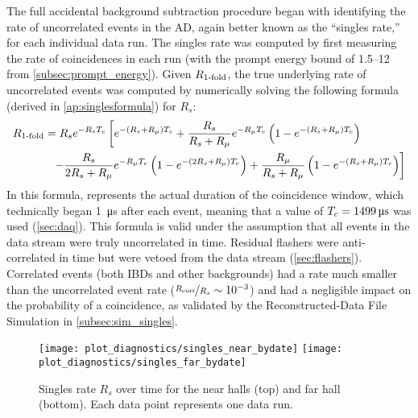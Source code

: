 The full accidental background subtraction procedure began with identifying
the rate of uncorrelated events in the AD, again better known
as the ``singles rate,'' for each individual data run.
The singles rate was computed by first measuring the rate of
 coincidences in each run
(with the prompt energy bound of \SIrange{1.5}{12}{\mev} from \cref{subsec:prompt_energy}).
Given $R_\text{\ensuremath{1}-fold}$, the true underlying rate of uncorrelated events was
computed by numerically solving the following formula
(derived in \cref{ap:singlesformula}) for $R_s$:
\begin{align}
    \label{eq:rsingles}
    \begin{split}
        R_{\text{\fold{1}}}
          &= R_s e^{-R_s\tc}
          \left[
              e^{-(R_s + R_\mu)\tc} +
              \frac{R_s}{R_s+R_\mu} e^{-R_\mu\tc}
              \left(
                  1 - e^{-(R_s + R_\mu)\tc}
              \right)
          \right. \\
          &\ \ %
          \left. - \frac{R_s}{2R_s + R_\mu} e^{-R_\mu\tc}
              \left(
                  1 - e^{-(2R_s + R_\mu)\tc}
              \right) +
              \frac{R_\mu}{R_s + R_\mu}
              \left(
                  1 - e^{-(R_s + R_\mu)\tc}
              \right)
          \right]
    \end{split}
\end{align}
In this formula, \tc{} represents the actual duration of the coincidence window,
which technically began \SI{1}{\micro\second} after each event,
meaning that a value of $T_c=\SI{1499}{\micro\second}$ was used (\cref{sec:daq}).
This formula is valid under the assumption that all
events in the data stream were truly uncorrelated in time.
Residual flashers were anti-correlated in time
but were vetoed from the data stream (\cref{sec:flashers}).
Correlated events (both IBDs and other backgrounds)
had a rate much smaller than the uncorrelated event rate
($\nicefrac{R_{\text{corr}}}{R_s} \sim 10^{-3}$)
and had a negligible impact on the probability of a  coincidence,
as validated by the Reconstructed-Data File Simulation in \cref{subsec:sim_singles}.

\begin{figure}
    \centering
    \texttt{[image: plot\_diagnostics/singles\_near\_bydate]}
    \texttt{[image: plot\_diagnostics/singles\_far\_bydate]}
    \caption[Singles rate over time]{
        Singles rate $R_s$ over time for
        the near halls (top) and far hall (bottom).
        Each data point represents one data run.
    }
    \label{fig:singles}
\end{figure}

